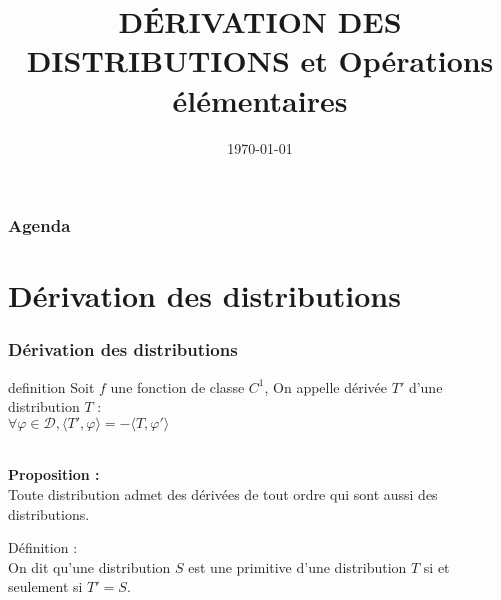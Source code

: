 \documentclass{beamer}
\title{DÉRIVATION DES DISTRIBUTIONS et Opérations élémentaires}
\author{}
\date{\today}
\begin{document}
\frame{\titlepage} %

\begin{frame}
\frametitle{Agenda}
\tableofcontents %
\end{frame}




\section{Dérivation des distributions}
\begin{frame}
\frametitle{Dérivation des distributions}
\begin{block}{definition}
Soit $f$ une fonction de classe $C^1$, On appelle dérivée $T'$ d'une distribution $T$ :\\
\hspace{1cm}\hspace{1cm}\hspace{1cm}\hspace{1cm} $\forall \varphi \in \mathcal{D}, \langle T', \varphi \rangle = -\langle T, \varphi' \rangle$
\end{block}
\\
\textbf{Proposition :}
\\
Toute distribution admet des dérivées de tout ordre qui sont aussi des distributions.
\\
\begin{block}{Définition :} \\
On dit qu'une distribution $S$ est une primitive d'une distribution $T$ si et seulement si $T' = S$.
\end{block}


\end{frame}
\end{document}
